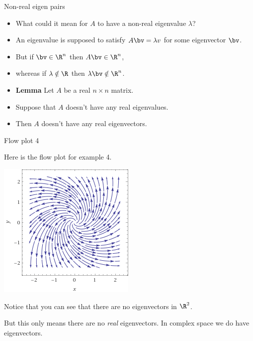 \documentclass{beamer}
\begin{document}
\begin{frame}{Non-real eigen pairs}

\begin{itemize}
\item What could it mean for $A$ to have a non-real eigenvalue $\lambda$?
\item An eigenvalue is supposed to satisfy $A\bv=\lambda v$ for some eigenvector $\bv$.
\item But if $\bv\in\R^n$ then $A\bv\in\R^n$,
\item whereas if $\lambda\notin\R$ then $\lambda\bv\notin\R^n$.
\item \textbf{Lemma} Let $A$ be a real $n\times n$ matrix.
\item Suppose that $A$ doesn't have any real eigenvalues.
\item Then $A$ doesn't have any real eigenvectors.
\end{itemize}
\end{frame}


\begin{frame}{Flow plot 4}


Here is the flow plot for example 4.

\pause

\begin{center}
\includegraphics[scale=0.45]{stream4}
\end{center}

\pause

Notice that you can see that there are no eigenvectors in $\R^2$.
\pause

But this only means there are no \emph{real} eigenvectors. In complex space
we do have eigenvectors.
\end{frame}
\end{document}
